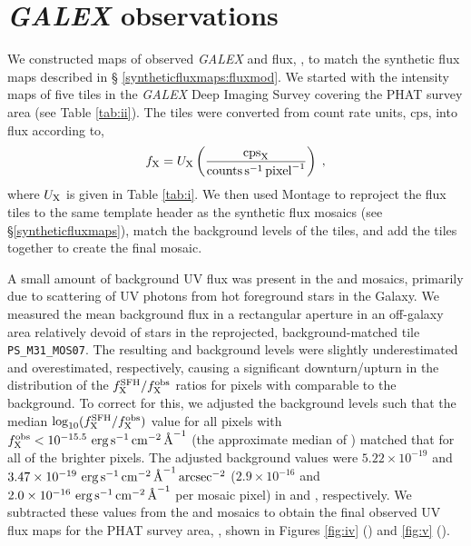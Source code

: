 \documentclass[iop, tighten]{emulateapj}
\begin{document}
\section{\emph{GALEX} observations}\label{observations}

\tabii

\figiv

\figv

We constructed maps of observed \emph{GALEX} \fuv{} and \nuv{} flux, \fxobs{},
to match the synthetic flux maps described in \S
\ref{syntheticfluxmaps:fluxmod}. We started with the intensity maps of five
tiles in the \emph{GALEX} Deep Imaging Survey \citep[DIS;][]{Martin:2005}
covering the PHAT survey area (see Table \ref{tab:ii}). The tiles were
converted from count rate units, $\mathrm{cps}$, into flux according to,
%
\begin{equation}
f_\filter = U_\filter \left(\frac{\mathrm{cps}_\filter}{
    \mathrm{counts} \ssec^{-1} \,\mathrm{pixel}^{-1}}\right) \; ,
\label{eq:cpstoflux}
\end{equation}
%
where $U_{\mathrm{X}}$ is given in Table \ref{tab:i}. We then used Montage to
reproject the flux tiles to the same template header as the synthetic flux
mosaics (see \S \ref{syntheticfluxmaps}), match the background levels of the
tiles, and add the tiles together to create the final mosaic.

A small amount of background UV flux was present in the \fuv{} and \nuv{}
mosaics, primarily due to scattering of UV photons from hot foreground stars in
the Galaxy. We measured the mean background flux in a rectangular aperture in an
off-galaxy area relatively devoid of stars in the reprojected,
background-matched tile \texttt{PS\_M31\_MOS07}. The resulting \fuv{} and \nuv{}
background levels were slightly underestimated and overestimated, respectively,
causing a significant downturn/upturn in the distribution of the $f_{\mathrm{X}}^{\mathrm{SFH}}/f_{\mathrm{X}}^{\mathrm{obs}}$
ratios for pixels with \fxobs{} comparable to the background. To correct for
this, we adjusted the background levels such that the median
$\log_{10}(f_{\mathrm{X}}^{\mathrm{SFH}}/f_{\mathrm{X}}^{\mathrm{obs}})$ value for all pixels with $f_{\mathrm{X}}^{\mathrm{obs}} <
10^{-15.5}\, \,\mathrm{erg}\,\mathrm{s}^{-1}\,\mathrm{cm}^{-2}\,\textrm{\AA}^{-1}$ (the approximate median of \fxobs{}) matched that for all
of the brighter pixels. The adjusted background values were $5.22 \times
10^{-19}$ and $3.47 \times 10^{-19}\, \,\mathrm{erg}\,\mathrm{s}^{-1}\,\mathrm{cm}^{-2}\,\textrm{\AA}^{-1}\,\mathrm{arcsec}^{-2}$ ($2.9 \times
10^{-16}$ and $2.0 \times 10^{-16}\, \,\mathrm{erg}\,\mathrm{s}^{-1}\,\mathrm{cm}^{-2}\,\textrm{\AA}^{-1}$ per mosaic pixel) in \fuv{} and
\nuv{}, respectively. We subtracted these values from the \fuv{} and \nuv{}
mosaics to obtain the final observed UV flux maps for the PHAT survey area,
\fxobs{}, shown in Figures \ref{fig:iv} (\fuv{}) and \ref{fig:v} (\nuv{}).
\end{document}
